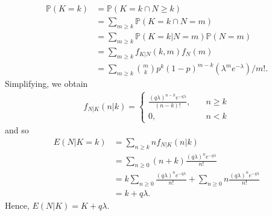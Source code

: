 \documentclass[12pt]{article}
\newcommand{\prob}{\mathbb{P}}
\theoremstyle{plain}
\theoremstyle{definition}
\theoremstyle{remark}
\numberwithin{equation}{section}  %
\begin{document}
\begin{align*}
\prob(K = k) & = \prob(K = k \cap N \ge k) 
\\
& = \sum_{m \ge k} \prob(K =
k \cap N = m) 
\\
& = \sum_{m \ge k} \prob(K = k | N = m) \prob(N = m)
\\
& = \sum_{m \ge k} f_{K|N}(k, m) f_N(m)
\\
& = \sum_{m \ge k}
\binom{m}{k} p^k (1 - p)^{m-k} (\lambda^m e^{-\lambda})/m!.
\end{align*}
Simplifying, we obtain
\begin{align*}
f_{N|K}(n|k) = 
\begin{cases}
\frac{(q\lambda)^{n-k} e^{-q\lambda}}{(n-k)!}, \quad & n \ge k
\\
0, \quad & n<k
\end{cases}
\end{align*}
and so 
\begin{align*}
E(N | K = k) & = \sum_{n \ge k} n f_{N|K}(n | k)
\\
& = \sum_{n \ge 0} (n + k) \frac{(q \lambda)^n e^{-q\lambda}}{n!}
\\
& = k \sum_{n \ge 0} \frac{(q \lambda)^n e^{-q\lambda}}{n!} + \sum_{n \ge 0}
n \frac{(q\lambda)^n e^{-q\lambda}}{n!} 
\\
& = k + q\lambda.
\end{align*}
Hence, $E(N|K) = K + q \lambda$.
\end{document}
